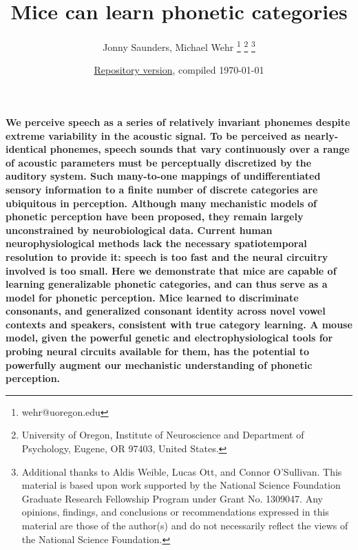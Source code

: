 \documentclass[11pt]{article}\usepackage[]{graphicx}\usepackage[]{color}
\begin{document}
\title{Mice can learn phonetic categories}
\author{Jonny Saunders, Michael Wehr 
\thanks{wehr@uoregon.edu} 
\thanks{University of Oregon, Institute of Neuroscience and Department of Psychology, Eugene, OR 97403, United States.} 
\thanks{Additional thanks to Aldis Weible, Lucas Ott, and Connor O'Sullivan. This material is based upon work supported by the National Science Foundation Graduate Research Fellowship Program under Grant No. 1309047. Any opinions, findings, and conclusions or recommendations expressed in this material are those of the author(s) and do not necessarily reflect the views of the National Science Foundation.}}
\date{\href{https://github.com/wehr-lab/SaundersWehr-JASA2019}{Repository version}, compiled \today}
































\twocolumn[
\maketitle
]
\saythanks

\bfseries\noindent We perceive speech as a series of relatively invariant phonemes despite extreme variability in the acoustic signal. To be perceived as nearly-identical phonemes, speech sounds that vary continuously over a range of acoustic parameters must be perceptually discretized by the auditory system. Such many-to-one mappings of undifferentiated sensory information to a finite number of discrete categories are ubiquitous in perception. Although many mechanistic models of phonetic perception have been proposed, they remain largely unconstrained by neurobiological data. Current human neurophysiological methods lack the necessary spatiotemporal resolution to provide it: speech is too fast and the neural circuitry involved is too small. Here we demonstrate that mice are capable of learning generalizable phonetic categories, and can thus serve as a model for phonetic perception. Mice learned to discriminate consonants, and generalized consonant identity across novel vowel contexts and speakers, consistent with true category learning. A mouse model, given the powerful genetic and electrophysiological tools for probing neural circuits available for them, has the potential to powerfully augment our mechanistic understanding of phonetic perception.\normalfont
\end{document}
